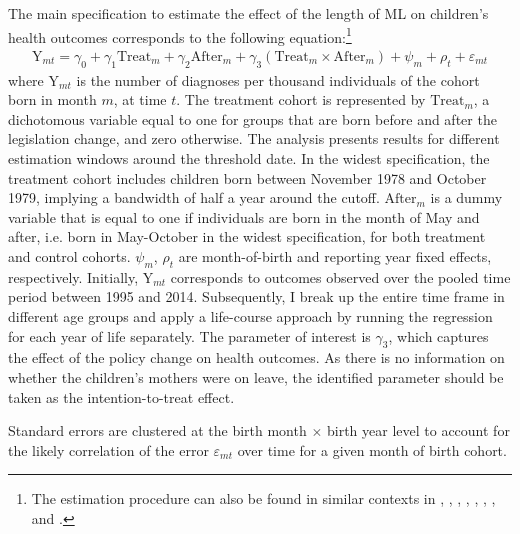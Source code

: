 The main specification to estimate the effect of the length of ML on children's health outcomes corresponds to the following equation:\footnote{The estimation procedure can also be found in similar contexts in \cite{RafaelLaliveandJosefZweimuller2009}, \cite{Dustmann2012}, \cite{Ekberg2013parental}, \cite{schonberg2014expansions}, \cite{Lalive2014}, \cite{danzer2017}, \cite{avdic2018modern}, and \cite{Huebener2017}.} %
\begin{align}
\text{Y}_{mt} = \gamma_0 + \gamma_1 \text{Treat}_{m} + \gamma_2 \text{After}_{m} + \gamma_3 (\text{Treat}_{m} \times \text{After}_{m}) + \psi_m + \rho_t + \varepsilon_{mt} \label{eq_mlch:DD_basline}
\end{align}
where $\text{Y}_{mt}$ is the number of diagnoses per thousand individuals of the cohort born in month $m$, at time $t$. The treatment cohort is represented by $\text{Treat}_{m}$, a dichotomous variable equal to one for groups that are born  before and after the legislation change, and zero otherwise. The analysis presents results for different estimation windows around the threshold date. In the widest specification, the treatment cohort includes children born between November 1978 and October 1979, implying a bandwidth of half a year around the cutoff. $\text{After}_{m}$ is a dummy variable that is equal to one if individuals are born in the month of May and after, i.e. born in May-October in the widest specification, for both treatment and control cohorts. $\psi_m$, $\rho_t$ are month-of-birth and reporting year fixed effects, respectively. Initially, $\text{Y}_{mt}$ corresponds to outcomes observed over the pooled time period between 1995 and 2014. Subsequently, I break up the entire time frame in different age groups and apply a life-course approach by running the regression for each year of life separately. The parameter of interest is $\gamma_3$, which captures the effect of the policy change on health outcomes. As there is no information on whether the children's mothers were on leave, the identified parameter should be taken as the intention-to-treat effect.

Standard errors are clustered at the birth month $\times$ birth year level to account for the likely correlation of the error $\varepsilon_{mt}$ over time for a given month of birth cohort.



